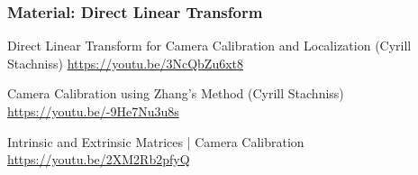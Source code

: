 \begin{frame}
  \frametitle{Material: Direct Linear Transform}

  Direct Linear Transform for Camera Calibration and Localization (Cyrill Stachniss)
  \url{https://youtu.be/3NcQbZu6xt8}

  Camera Calibration using Zhang's Method (Cyrill Stachniss)
  \url{https://youtu.be/-9He7Nu3u8s}

  Intrinsic and Extrinsic Matrices | Camera Calibration
  \url{https://youtu.be/2XM2Rb2pfyQ}

\end{frame}
